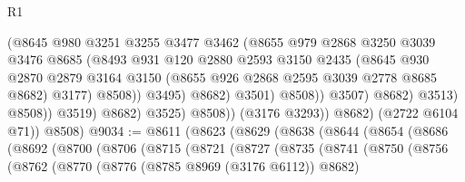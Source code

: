 \begin{lexlean}{R1}
\begin{coremodule}
                                        (@8645
                                          @980
                                          @3251
                                          @3255
                                          @3477
                                          @3462
                                          (@8655
                                            @979
                                            @2868
                                            @3250
                                            @3039
                                            @3476
                                            @8685
                                            (@8493
                                              @931
                                              @120
                                              @2880
                                              @2593
                                              @3150
                                              @2435
                                              (@8645
                                                @930
                                                @2870
                                                @2879
                                                @3164
                                                @3150
                                                (@8655 @926 @2868 @2595 @3039 @2778 @8685 @8682)
                                                @3177)
                                              @8508))
                                          @3495)
                                        @8682)
                                      @3501)
                                    @8508))
                                @3507)
                              @8682)
                            @3513)
                          @8508))
                      @3519)
                    @8682)
                  @3525)
                @8508))
            (@3176 @3293))
          @8682)
        (@2722 @6104 @71))
      @8508)
@9034 := @8611
    (@8623
      (@8629
        (@8638
          (@8644
            (@8654
              (@8686
                (@8692
                  (@8700
                    (@8706
                      (@8715
                        (@8721
                          (@8727
                            (@8735
                              (@8741
                                (@8750
                                  (@8756
                                    (@8762
                                      (@8770
                                        (@8776 (@8785 @8969 (@3176 @6112)) @8682)

\end{coremodule}
\end{lexlean}
